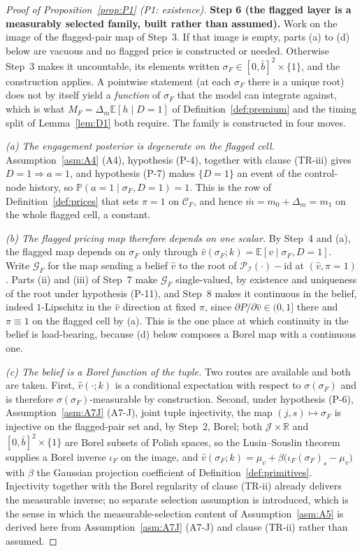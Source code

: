 \documentclass[11pt]{article}
\newcommand{\Eop}{\mathbb{E}}
\newcommand{\Prb}{\mathbb{P}}
\begin{document}
\begin{proof}[Proof of Proposition~\ref{prop:P1} (P1: existence)]
\smallskip
\noindent\textbf{Step 6 (the flagged layer is a measurably selected family, built rather than
assumed).}
Work on the image of the flagged-pair map of Step~3. If that image is empty, parts (a) to (d) below
are vacuous and no flagged price is constructed or needed. Otherwise Step~3 makes it uncountable, its
elements written $\sigma_F \in [0,\bar b]^2 \times \{1\}$, and the construction applies. A pointwise
statement (at each $\sigma_F$ there is a unique root) does not by itself
yield a \emph{function} of $\sigma_F$ that the model can integrate against, which is what
$M_F = \Delta_m\Eop[h \mid D=1]$ of Definition~\ref{def:premium} and the timing split of
Lemma~\ref{lem:D1} both require. The family is constructed in four moves.

\emph{(a) The engagement posterior is degenerate on the flagged cell.} Assumption~\ref{asm:A4} (A4),
hypothesis (P-4), together with clause (TR-iii) gives $D = 1 \Rightarrow a = 1$, and hypothesis (P-7)
makes $\{D = 1\}$ an event of the control-node history, so $\Prb(a = 1 \mid \sigma_F, D=1) = 1$. This
is the row of Definition~\ref{def:prices} that sets $\pi = 1$ on $\mathcal C_F$, and hence
$\bar m = m_0+\Delta_m = m_1$ on the whole flagged cell, a constant.

\emph{(b) The flagged pricing map therefore depends on one scalar.} By Step~4 and (a), the flagged
map depends on $\sigma_F$ only through $\hat v(\sigma_F;k) = \Eop[v \mid \sigma_F, D=1]$. Write
$\mathcal G_F$ for the map sending a belief $\hat v$ to the root of
$\mathcal P_{\mathcal I}(\cdot)-\mathrm{id}$ at $(\hat v,\pi=1)$. Parts (ii) and (iii) of Step~7 make
$\mathcal G_F$ single-valued, by existence and uniqueness of the root under hypothesis (P-11), and
Step~8 makes it continuous in the belief, indeed $1$-Lipschitz in the $\hat v$ direction at fixed
$\pi$, since $\partial P/\partial\hat v \in (0,1]$ there and $\pi \equiv 1$ on the flagged cell by
(a). This is the one place at which continuity in the belief is load-bearing, because (d) below
composes a Borel map with a continuous one.

\emph{(c) The belief is a Borel function of the tuple.} Two routes are available and both are taken.
First, $\hat v(\cdot;k)$ is a conditional expectation with respect to $\sigma(\sigma_F)$ and is
therefore $\sigma(\sigma_F)$-measurable by construction. Second, under hypothesis (P-6),
Assumption~\ref{asm:A7J} (A7-J), joint tuple injectivity, the map $(j,s) \mapsto \sigma_F$ is
injective on the flagged-pair set and, by Step~2, Borel; both $\mathcal J \times \mathbb R$ and
$[0,\bar b]^2\times\{1\}$ are Borel subsets of Polish spaces, so the Lusin--Souslin theorem supplies
a Borel inverse $\iota_F$ on the image, and
$\hat v(\sigma_F;k) = \mu_v + \beta\bigl(\iota_F(\sigma_F)_s - \mu_v\bigr)$
with $\beta$ the Gaussian projection coefficient of Definition~\ref{def:primitives}. Injectivity
together with the Borel regularity of clause (TR-ii) already delivers the measurable inverse; no
separate selection assumption is introduced, which is the sense in which the measurable-selection
content of Assumption~\ref{asm:A5} is derived here from Assumption~\ref{asm:A7J} (A7-J) and clause (TR-ii)
rather than assumed.


\end{proof}
\end{document}
